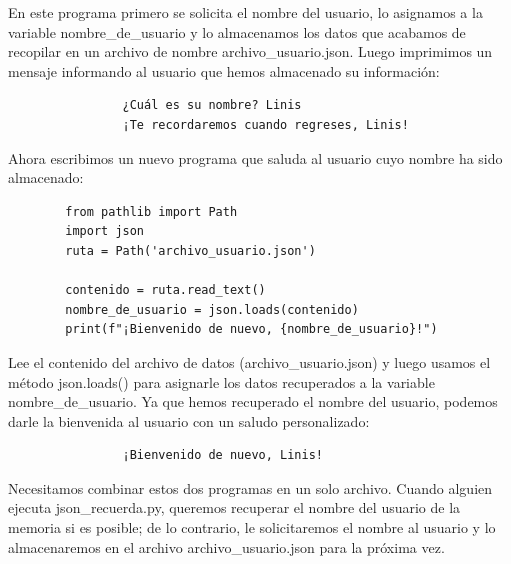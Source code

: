 {	En este programa primero se solicita el nombre del usuario,  lo asignamos a la variable {\ttfamily nombre\_de\_usuario} y lo almacenamos los datos que acabamos de recopilar en un archivo de nombre  {\ttfamily archivo\_usuario.json}. Luego imprimimos un mensaje informando al usuario que hemos almacenado su información:
	
	{\ttfamily\scriptsize\scriptsize 
		\hspace{-0.65cm} \vspace{-0.3cm}	
		{\color{blue} 	
			\begin{verbatim}
				¿Cuál es su nombre? Linis
				¡Te recordaremos cuando regreses, Linis!
			\end{verbatim}
	}}
	
	Ahora escribimos un nuevo programa que saluda al usuario cuyo nombre ha sido almacenado:
	
	\hspace{-2.4cm}{\ttfamily \scriptsize saludo\_}
	
	\vspace{-0.3cm}
	\hspace{-2.4cm}{\ttfamily \scriptsize usuario.py}\vspace{-0.84cm}
	\begin{lstlisting}
		from pathlib import Path
		import json
		ruta = Path('archivo_usuario.json')
		
		contenido = ruta.read_text()
		nombre_de_usuario = json.loads(contenido)
		print(f"¡Bienvenido de nuevo, {nombre_de_usuario}!")
	\end{lstlisting}
	
	Lee el contenido del archivo de datos ({\ttfamily archivo\_usuario.json}) y luego usamos el método {\ttfamily  json.loads()} para asignarle los datos recuperados a la variable {\ttfamily nombre\_de\_usuario}. 
	Ya que hemos recuperado el nombre del usuario, podemos darle la bienvenida al usuario con un saludo personalizado:
	
	{\ttfamily\scriptsize\scriptsize 
		\hspace{-0.65cm} \vspace{-0.3cm}	
		{\color{blue} 	
			\begin{verbatim}
				¡Bienvenido de nuevo, Linis!
			\end{verbatim}
	}}
	
	Necesitamos combinar estos dos programas en un solo archivo. Cuando alguien
	ejecuta {\ttfamily json\_recuerda.py}, queremos recuperar el nombre del usuario de la memoria si es
	posible; de lo contrario, le solicitaremos el nombre al usuario y lo almacenaremos en el archivo {\ttfamily archivo\_usuario.json} para la próxima vez.
	
}

